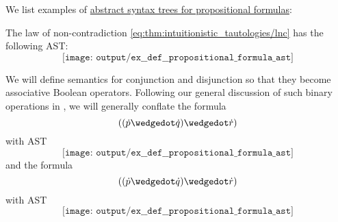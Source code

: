 \begin{example}\label{ex:def:propositional_fomula_ast}
  We list examples of \hyperref[def:propositional_fomula_ast]{abstract syntax trees for propositional formulas}:
  \begin{thmenum}
     The law of non-contradiction \eqref{eq:thm:intuitionistic_tautologies/lnc} has the following AST:
    \begin{equation*}
      \texttt{[image: output/ex\_\_def\_\_propositional\_formula\_ast]}
    \end{equation*}

     We will define semantics for conjunction and disjunction so that they become associative Boolean operators. Following our general discussion of such binary operations in , we will generally conflate the formula
    \begin{equation*}
      ((\synp \synwedge \syn q) \synwedge \syn r)
    \end{equation*}
    with AST
    \begin{equation*}
      \texttt{[image: output/ex\_\_def\_\_propositional\_formula\_ast]}
    \end{equation*}
    and the formula
    \begin{equation*}
      ((\synp \synwedge \syn q) \synwedge \syn r)
    \end{equation*}
    with AST
    \begin{equation*}
      \texttt{[image: output/ex\_\_def\_\_propositional\_formula\_ast]}
    \end{equation*}
  \end{thmenum}
\end{example}

